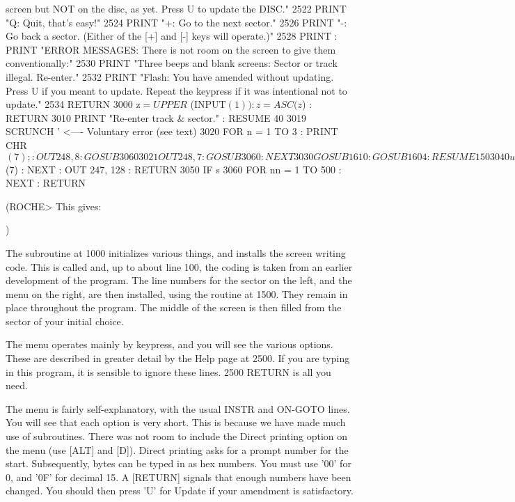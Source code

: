 screen but NOT on the disc, as yet. Press U to update the DISC."
        2522 PRINT "Q: Quit, that's easy!"
        2524 PRINT "+: Go to the next sector."
        2526 PRINT "-: Go back a sector. (Either of the [+] and [-] keys  will 
operate.)"
        2528 PRINT : PRINT "ERROR MESSAGES: There is not room on the screen to 
give them conventionally:"
        2530  PRINT "Three beeps and blank screens: Sector or  track  illegal. 
Re-enter."
        2532  PRINT "Flash: You have amended without updating. Press U if  you 
meant to update. Repeat the keypress if it was intentional not to update."
        2534 RETURN
        3000 z$ = UPPER$ (INPUT$ (1)) : z = ASC (z$) : RETURN
        3010 PRINT "Re-enter track & sector." : RESUME 40
        3019 SCRUNCH  ' <---- Voluntary error (see text)
        3020 FOR n = 1 TO 3 : PRINT CHR$ (7); : OUT 248, 8 : GOSUB 3060
        3021 OUT 248, 7 : GOSUB 3060 : NEXT
        3030 GOSUB 1610 : GOSUB 1604 : RESUME 150
        3040 uf = 0 : FOR n = 1 TO 5 : PRINT CHR$ (7) : NEXT : OUT 247, 128  : 
RETURN
        3050 IF s%
        3060 FOR nn = 1 TO 500 : NEXT : RETURN

(ROCHE> This gives:

$$$$
)

The  subroutine  at 1000 initializes various things, and installs  the  screen 
writing  code. This is called and, up to about line 100, the coding  is  taken 
from an earlier development of the program. The line numbers for the sector on 
the left, and the menu on the right, are then installed, using the routine  at 
1500. They remain in place throughout the program. The middle of the screen is 
then filled from the sector of your initial choice.

The  menu operates mainly by keypress, and you will see the  various  options. 
These  are  described in greater detail by the Help page at 2500. If  you  are 
typing  in this program, it is sensible to ignore these lines. 2500 RETURN  is 
all you need.

The  menu is fairly self-explanatory, with the usual INSTR and ON-GOTO  lines. 
You will see that each option is very short. This is because we have made much 
use  of subroutines. There was not room to include the Direct printing  option 
on the menu (use [ALT] and [D]). Direct printing asks for a prompt number  for 
the  start. Subsequently, bytes can be typed in as hex numbers. You  must  use 
'00'  for 0, and '0F' for decimal 15. A [RETURN] signals that  enough  numbers 
have  been changed. You should then press 'U' for Update if your amendment  is 
satisfactory.

